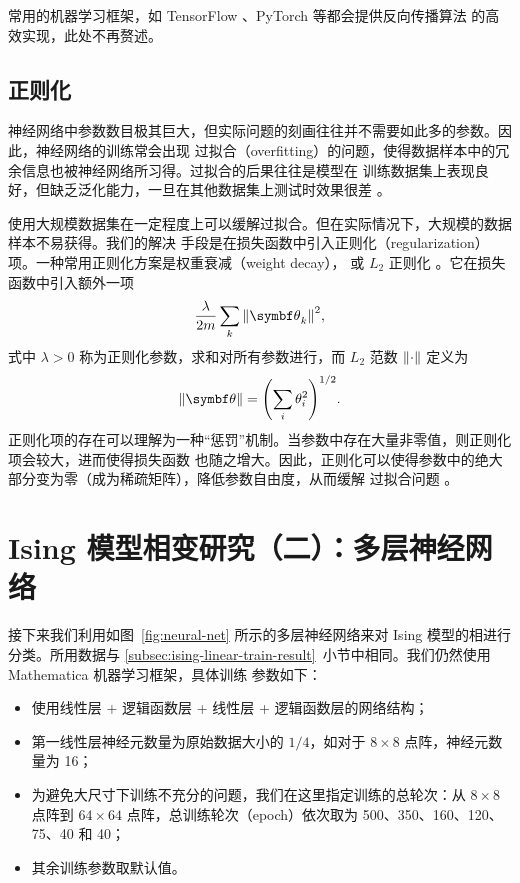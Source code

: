 常用的机器学习框架，如 TensorFlow \cite{tensorflow}、PyTorch \cite{pytorch} 等都会提供反向传播算法
的高效实现，此处不再赘述。

\subsection{正则化}
\label{subsec:regularization}

神经网络中参数数目极其巨大，但实际问题的刻画往往并不需要如此多的参数。因此，神经网络的训练常会出现
过拟合（overfitting）的问题，使得数据样本中的冗余信息也被神经网络所习得。过拟合的后果往往是模型在
训练数据集上表现良好，但缺乏泛化能力，一旦在其他数据集上测试时效果很差 \cite{zhouzhihua}。

使用大规模数据集在一定程度上可以缓解过拟合。但在实际情况下，大规模的数据样本不易获得。我们的解决
手段是在损失函数中引入正则化（regularization）项。一种常用正则化方案是权重衰减（weight decay），
或 $L_2$ 正则化 \cite{goodfellow2016deep}。它在损失函数中引入额外一项
\begin{equation}
  \frac{\lambda}{2m} \sum_k \norm{\bm{\theta}_k}^2,
\end{equation}
式中 $\lambda>0$ 称为正则化参数，求和对所有参数进行，而 $L_2$ 范数 $\norm{\cdot}$ 定义为
\begin{equation}
  \norm{\bm{\theta}} = \qty(\sum_i \theta_i^2)^{1/2}.
\end{equation}
正则化项的存在可以理解为一种“惩罚”机制。当参数中存在大量非零值，则正则化项会较大，进而使得损失函数
也随之增大。因此，正则化可以使得参数中的绝大部分变为零（成为稀疏矩阵），降低参数自由度，从而缓解
过拟合问题 \cite{goodfellow2016deep,zhouzhihua}。

\section{Ising 模型相变研究（二）：多层神经网络}

接下来我们利用如图~\ref{fig:neural-net} 所示的多层神经网络来对 Ising 模型的相进行分类。所用数据与
\ref{subsec:ising-linear-train-result}~小节中相同。我们仍然使用 Mathematica 机器学习框架，具体训练
参数如下：

\begin{itemize}
  \item 使用线性层 + 逻辑函数层 + 线性层 + 逻辑函数层的网络结构；
  \item 第一线性层神经元数量为原始数据大小的 $1/4$，如对于 $8 \times 8$ 点阵，神经元数量为 16；
  \item 为避免大尺寸下训练不充分的问题，我们在这里指定训练的总轮次：从 $8 \times 8$ 点阵到
    $64 \times 64$ 点阵，总训练轮次（epoch）依次取为 500、350、160、120、75、40 和 40；
  \item 其余训练参数取默认值。
\end{itemize}

